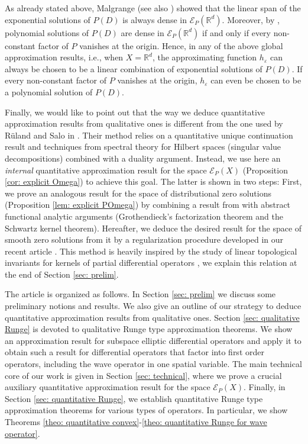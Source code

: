 \documentclass[12pt]{amsart}
\newcommand{\R}{\mathbb{R}}
\theoremstyle{definition}
\theoremstyle{remark}
\numberwithin{equation}{section}
\begin{document}
As already stated above,  Malgrange \cite[Chapitre 1.2, Th\'eor\`eme 2]{Malgrange} (see also \cite[Theorem 10.5.1]{HoermanderPDO2}) showed that the linear span of the  exponential solutions  of $P(D)$ is always dense in $\mathscr{E}_P(\R^d)$. Moreover, by \cite[Chapitre 1.2, Th\'eor\`eme $2^\prime$]{Malgrange}, polynomial solutions of $P(D)$ are dense in $\mathscr{E}_P(\R^d)$ if and only if every non-constant factor of $P$ vanishes at the origin. Hence, in any of the above global approximation results, i.e., when $X=\R^d$, the approximating function $h_\varepsilon$ can always be chosen to be a linear combination of exponential solutions of $P(D)$. If every non-constant factor of $P$ vanishes at the origin, $h_\varepsilon$ can even be chosen to be a polynomial solution of $P(D)$.

Finally, we  would like to point out that the way we deduce quantitative approximation results from qualitative ones is different from the one used by  R\"uland and Salo in \cite{RuSa19, RuSa20}. Their method relies on a quantitative unique continuation result and techniques from spectral theory for Hilbert spaces (singular value decompositions) combined with a duality argument. Instead, we use here  an  \emph{internal} quantitative approximation result for the space $\mathscr{E}_P(X)$ (Proposition \ref{cor: explicit Omega}) to achieve this goal. The latter is shown in two steps: First, we prove an analogous result for the space of distributional zero solutions (Proposition \ref{lem: explicit POmega}) by combining  a result from \cite[Section 3.4.5]{Wengenroth} with abstract functional analytic arguments (Grothendieck's factorization theorem and the Schwartz kernel theorem). Hereafter, we deduce the desired result for the space of smooth zero solutions from it by a regularization procedure developed in our recent article \cite{DeKa22}.  This method is heavily inspired by  the study of linear topological invariants for kernels of partial differential operators \cite{B-D2006,DeKa22, Kalmes19,Vogt1983}, we explain this relation at the end of Section \ref{sec: prelim}.

The article is organized as follows. In Section \ref{sec: prelim} we discuss some preliminary notions and results.  We also give an outline of our strategy to deduce quantitative approximation results from qualitative ones. Section \ref{sec: qualitative Runge} is devoted to qualitative Runge type approximation theorems. We show an approximation result for subspace elliptic differential operators and apply it to obtain such a result for differential operators that factor into first order operators, including the wave operator in one spatial variable. The main technical core of our work is given in Section \ref{sec: technical}, where we prove a crucial auxiliary quantitative approximation result for the space $\mathscr{E}_P(X)$.  Finally, in Section \ref{sec: quantitative Runge}, we  establish quantitative Runge type approximation theorems for various types of operators. In particular, we show Theorems \ref{theo: quantitative convex}-\ref{theo: quantitative Runge for wave operator}.
\end{document}
